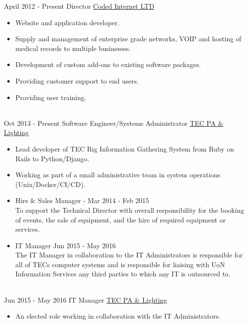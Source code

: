 \documentclass[a4paper]{twentysecondcv} %
\begin{document}
\begin{twenty} %
    \twentyitem
        {April 2012 -}
        {Present}
        {Director}
        {\href{http://www.codedinternet.com}{Coded Internet LTD}}
        {}
        {
        {
        \begin{itemize}
        \item Website and application developer.
        \item Supply and management of enterprise grade networks, VOIP and hosting of medical records to multiple businesses.
        \item Development of custom add-ons to existing software packages.
        \item Providing customer support to end users.
        \item Providing user training.
        \end{itemize}
        }
        }
     \\
    \twentyitem
    	{Oct 2013 -}
		{Present}
        {Software Engineer/Systems Administrator }
        {\href{https://www.nottinghamtec.co.uk}{TEC PA \& Lighting}}
        {}
        {\begin{itemize}
        \item Lead developer of TEC Rig Information Gathering System from Ruby on Rails to Python/Django.
        \item Working as part of a small administrative team in system operations (Unix/Docker/CI/CD).
        \item Hire \& Sales Manager - Mar 2014 - Feb 2015 \\ To support the Technical Director with overall responsibility for the booking of events, the sale of equipment, and the hire of required equipment or services.
        \item IT Manager Jun 2015 - May 2016 \\ The IT Manager in collaboration to the IT Administrators is responsible for all of TECs computer systems and is responsible for liaising with UoN Information Services any third parties to which any IT is outsourced to.
        \end{itemize}}
        \\
    \twentyitem
        {Jun 2015 -}
        {May 2016}
        {IT Manager}
        {\href{https://www.nottinghamtec.co.uk}{TEC PA \& Lighting}}
        {}
        {
        {\begin{itemize}
        \item An elected role working in collaboration with the IT Administrators.

\end{itemize}}}
\end{twenty}
\end{document}
